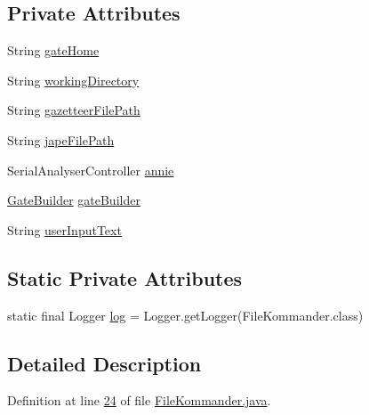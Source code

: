 \subsection*{Private Attributes}
\begin{DoxyCompactItemize}
\item 
String \hyperlink{classcom_1_1poly_1_1nlp_1_1filekommander_1_1_file_kommander_a4bdc4a5222eda1d37838da216256504e}{gate\-Home}
\item 
String \hyperlink{classcom_1_1poly_1_1nlp_1_1filekommander_1_1_file_kommander_a862ebb1796e89d0d83d348797e7c6472}{working\-Directory}
\item 
String \hyperlink{classcom_1_1poly_1_1nlp_1_1filekommander_1_1_file_kommander_addc44216b38536fd6b1ade38a6c2abdc}{gazetteer\-File\-Path}
\item 
String \hyperlink{classcom_1_1poly_1_1nlp_1_1filekommander_1_1_file_kommander_a2304e5f2732e0911893782dee866ee6d}{jape\-File\-Path}
\item 
Serial\-Analyser\-Controller \hyperlink{classcom_1_1poly_1_1nlp_1_1filekommander_1_1_file_kommander_a5c3ff51dc7f068e9442618b7c2ab1810}{annie}
\item 
\hyperlink{classcom_1_1poly_1_1nlp_1_1filekommander_1_1gate_1_1_gate_builder}{Gate\-Builder} \hyperlink{classcom_1_1poly_1_1nlp_1_1filekommander_1_1_file_kommander_a49132471a5825278776bfb4a84d8caa0}{gate\-Builder}
\item 
String \hyperlink{classcom_1_1poly_1_1nlp_1_1filekommander_1_1_file_kommander_a499151b0f39dbce7b82a811c8cf21402}{user\-Input\-Text}
\end{DoxyCompactItemize}
\subsection*{Static Private Attributes}
\begin{DoxyCompactItemize}
\item 
static final Logger \hyperlink{classcom_1_1poly_1_1nlp_1_1filekommander_1_1_file_kommander_a5f984d5ddadc6bc7206d293382ee298e}{log} = Logger.\-get\-Logger(File\-Kommander.\-class)
\end{DoxyCompactItemize}


\subsection{Detailed Description}


Definition at line \hyperlink{L24}{24} of file \hyperlink{}{File\-Kommander.\-java}.



